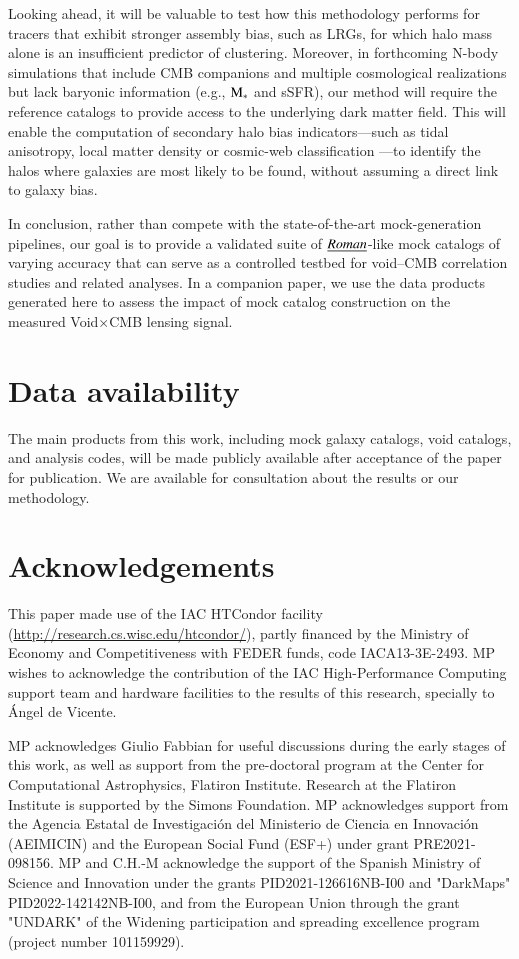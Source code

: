 \documentclass[]{aa} %
\begin{document}
Looking ahead, it will be valuable to test how this methodology performs for tracers that exhibit stronger assembly bias, such as LRGs, for which halo mass alone is an insufficient predictor of clustering. Moreover, in forthcoming N-body simulations that include CMB companions and multiple cosmological realizations but lack baryonic information (e.g., $\rm M_{*}$ and sSFR), our method will require the reference catalogs to provide access to the underlying dark matter field. This will enable the computation of secondary halo bias indicators---such as tidal anisotropy, local matter density or cosmic-web classification \citep{balaguera2024}---to identify the halos where galaxies are most likely to be found, without assuming a direct link to galaxy bias.

In conclusion, rather than compete with the state-of-the-art mock-generation pipelines, our goal is to provide a validated suite of $\emph{Roman}$-like mock catalogs of varying accuracy that can serve as a controlled testbed for void–CMB correlation studies and related analyses. In a companion paper, we use the data products generated here to assess the impact of mock catalog construction on the measured Void$\times$CMB lensing signal.

\section*{Data availability}
The main products from this work, including mock galaxy catalogs, void catalogs, and analysis codes, will be made publicly available after acceptance of the paper for publication. We are available for consultation about the results or our methodology.

\section*{Acknowledgements}
This paper made use of the IAC HTCondor facility
(\url{http://research.cs.wisc.edu/htcondor/}), partly financed by the Ministry of Economy and Competitiveness with FEDER funds, code IACA13-3E-2493. MP wishes to acknowledge the contribution of the IAC High-Performance Computing support team and hardware facilities to the results of this research, specially to Ángel de Vicente. 

MP acknowledges Giulio Fabbian for useful discussions during the early stages of this work, as well as support from the pre-doctoral program at the Center for Computational Astrophysics, Flatiron Institute. Research at the Flatiron Institute is supported by the Simons Foundation. MP acknowledges support from the Agencia Estatal de Investigación del Ministerio de Ciencia en Innovación (AEIMICIN) and the European Social Fund (ESF+) under grant PRE2021-098156. MP and C.H.-M acknowledge the support of the Spanish Ministry of Science and Innovation under the grants PID2021-126616NB-I00 and "DarkMaps" PID2022-142142NB-I00, and from the European Union through the grant "UNDARK" of the Widening participation and spreading excellence program (project number 101159929). 
\end{document}
